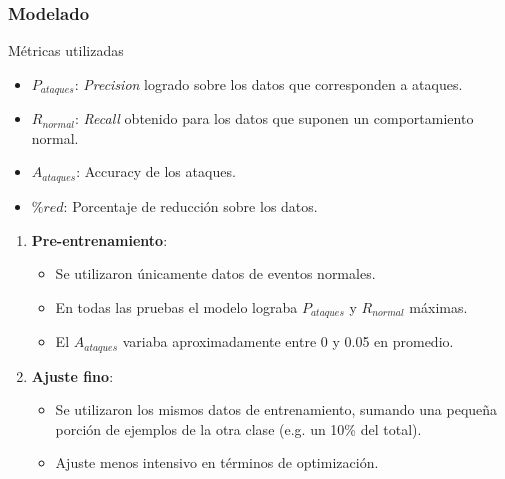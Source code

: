 \begin{frame}[t,fragile]
	\frametitle {Modelado}

\begin{block}{Métricas utilizadas}
	\begin{itemize}
		\item \scriptsize $P_{ataques}$: \textit{Precision} logrado sobre los datos que corresponden a ataques.
		\item \scriptsize $R_{normal}$: \textit{Recall} obtenido para los datos que suponen un comportamiento normal.
		
		\item \scriptsize $A_{ataques}$: Accuracy de los ataques.
		\item \scriptsize $\% red $: Porcentaje de reducción sobre los datos.
	\end{itemize}
\end{block}

\begin{enumerate}
	\item \textbf{Pre-entrenamiento}:
	
	\begin{itemize}
		\item Se utilizaron únicamente datos de eventos normales.
		
		\item En todas las pruebas el modelo lograba $P_{ataques}$ y $R_{normal}$ máximas.
		
		\item El $A_{ataques}$ variaba aproximadamente entre 0 y 0.05 en promedio.
	\end{itemize}
	
	\item \textbf{Ajuste fino}: 
	
	\begin{itemize}
		\item Se utilizaron los mismos datos de entrenamiento, sumando una pequeña porción de ejemplos de la otra clase (e.g. un 10\% del total).
		
		\item Ajuste menos intensivo en términos de optimización.
	\end{itemize}
	
\end{enumerate}

\end{frame}
\watermarkon
\watermarkoff
